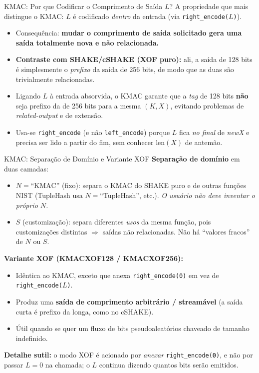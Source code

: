 \documentclass{beamer}
\begin{document}
\begin{frame}{KMAC: Por que Codificar o Comprimento de Saída $L$?}
    A propriedade que mais distingue o KMAC: \alert{$L$ é codificado \emph{dentro} da entrada} (via \texttt{right\_encode($L$)}).
    \medskip
    \begin{itemize}
        \footnotesize
        \item Consequência: \textbf{mudar o comprimento de saída solicitado gera uma saída totalmente nova e não relacionada.}
        \item \textbf{Contraste com SHAKE/cSHAKE (XOF puro):} ali, a saída de 128 bits é simplesmente o \emph{prefixo} da saída de 256 bits, de modo que as duas são trivialmente relacionadas.
        \item Ligando $L$ à entrada absorvida, o KMAC garante que a \textit{tag} de 128 bits \textbf{não} seja prefixo da de 256 bits para a mesma $(K, X)$, evitando problemas de \emph{related-output} e de extensão.
        \item Usa-se \texttt{right\_encode} (e não \texttt{left\_encode}) porque $L$ fica \emph{no final} de \textit{newX} e precisa ser lido a partir do fim, sem conhecer $\text{len}(X)$ de antemão.
    \end{itemize}
\end{frame}

\begin{frame}{KMAC: Separação de Domínio e Variante XOF}
    \textbf{Separação de domínio} em duas camadas:
    \begin{itemize}
        \footnotesize
        \item $N = \text{``KMAC''}$ (fixo): separa o KMAC do SHAKE puro e de outras funções NIST (TupleHash usa $N=$``TupleHash'', etc.). \emph{O usuário não deve inventar o próprio $N$.}
        \item $S$ (customização): separa diferentes \emph{usos} da mesma função, pois customizações distintas $\Rightarrow$ saídas não relacionadas. Não há ``valores fracos'' de $N$ ou $S$.
    \end{itemize}
    \medskip
    \textbf{Variante XOF (KMACXOF128 / KMACXOF256):}
    \begin{itemize}
        \footnotesize
        \item Idêntica ao KMAC, exceto que anexa \texttt{right\_encode(0)} em vez de \texttt{right\_encode($L$)}.
        \item Produz uma \textbf{saída de comprimento arbitrário / streamável} (a saída curta é prefixo da longa, como no cSHAKE).
        \item Útil quando se quer um fluxo de bits pseudoaleatórios chaveado de tamanho indefinido.
    \end{itemize}
    \medskip
    \begin{tcolorbox}[colback=gray!8,colframe=gray!60!black,boxrule=0.5pt]
        \footnotesize
        \textbf{Detalhe sutil:} o modo XOF é acionado por \emph{anexar} \texttt{right\_encode(0)}, e não por passar $L = 0$ na chamada; o $L$ continua dizendo quantos bits serão emitidos.
    \end{tcolorbox}
\end{frame}
\end{document}
